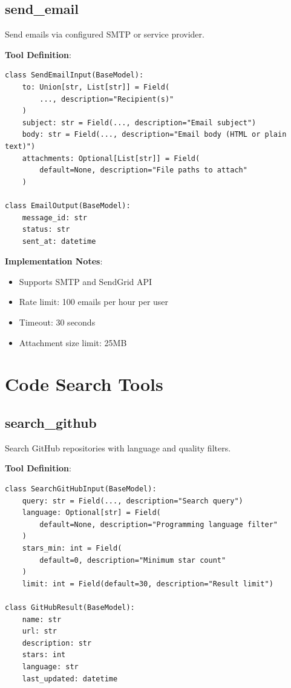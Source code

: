\documentclass{report}
\begin{document}
\subsection{send\_email}

Send emails via configured SMTP or service provider.

\textbf{Tool Definition}:
\begin{lstlisting}
class SendEmailInput(BaseModel):
    to: Union[str, List[str]] = Field(
        ..., description="Recipient(s)"
    )
    subject: str = Field(..., description="Email subject")
    body: str = Field(..., description="Email body (HTML or plain text)")
    attachments: Optional[List[str]] = Field(
        default=None, description="File paths to attach"
    )

class EmailOutput(BaseModel):
    message_id: str
    status: str
    sent_at: datetime
\end{lstlisting}

\textbf{Implementation Notes}:
\begin{itemize}
    \item Supports SMTP and SendGrid API
    \item Rate limit: 100 emails per hour per user
    \item Timeout: 30 seconds
    \item Attachment size limit: 25MB
\end{itemize}

\section{Code Search Tools}

\subsection{search\_github}

Search GitHub repositories with language and quality filters.

\textbf{Tool Definition}:
\begin{lstlisting}
class SearchGitHubInput(BaseModel):
    query: str = Field(..., description="Search query")
    language: Optional[str] = Field(
        default=None, description="Programming language filter"
    )
    stars_min: int = Field(
        default=0, description="Minimum star count"
    )
    limit: int = Field(default=30, description="Result limit")

class GitHubResult(BaseModel):
    name: str
    url: str
    description: str
    stars: int
    language: str
    last_updated: datetime
\end{lstlisting}
\end{document}
